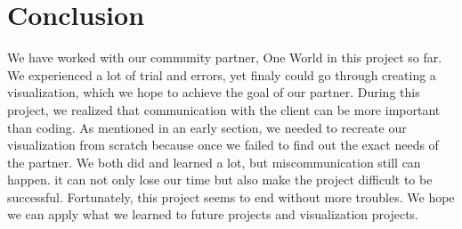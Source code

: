 \documentclass[a4paper]{article}
\begin{document}
\section{Conclusion}
We have worked with our community partner, One World in this project so far. We experienced a lot of trial and errors, yet finaly could go through creating a visualization, which we hope to achieve the goal of our partner. During this project, we realized that communication with the client can be more important than coding. As mentioned in an early section, we needed to recreate our visualization from scratch because once we failed to find out the exact needs of the partner. We both did and learned a lot, but miscommunication still can happen. it can not only lose our time but also make the project difficult to be successful. Fortunately, this project seems to end without more troubles. We hope we can apply what we learned to future projects and visualization projects.
\end{document}
